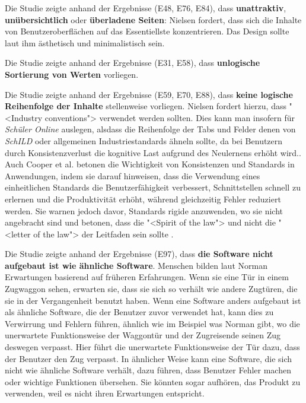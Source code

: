 Die Studie zeigte anhand der Ergebnisse (E48, E76, E84), dass \textbf{unattraktiv}, \textbf{unübersichtlich} oder \textbf{überladene Seiten}: Nielsen fordert, dass sich die Inhalte von Benutzeroberflächen auf das Essentiellste konzentrieren. Das Design sollte laut ihm ästhetisch und minimalistisch sein. \cite{Nielsen10}

Die Studie zeigte anhand der Ergebnisse (E31, E58), dass \textbf{unlogische Sortierung von Werten} vorliegen.

Die Studie zeigte anhand der Ergebnisse (E59, E70, E88), dass \textbf{keine logische Reihenfolge der Inhalte} stellenweise vorliegen. Nielsen fordert hierzu, dass "<Industry conventions"> verwendet werden sollten.\cite{Nielsen10} Dies kann man insofern für \textit{Schüler Online} auslegen, alsdass die Reihenfolge der Tabs und Felder denen von \textit{SchILD} oder allgemeinen Industriestandards ähneln sollte, da bei Benutzern durch Konsistenzverlust die kognitive Last aufgrund des Neulernens erhöht wird.\cite{Nielsen10}. Auch Cooper et al. betonen die Wichtigkeit von Konsistenzen und Standards in Anwendungen, indem sie darauf hinweisen, dass die Verwendung eines einheitlichen Standards die Benutzerfähigkeit verbessert, Schnittstellen schnell zu erlernen und die Produktivität erhöht, während gleichzeitig Fehler reduziert werden. Sie warnen jedoch davor, Standards rigide anzuwenden, wo sie nicht angebracht sind und betonen, dass die "<Spirit of the law"> und nicht die "<letter of the law"> der Leitfaden sein sollte \cite{CooperReimannEtAl14}.

Die Studie zeigte anhand der Ergebnisse (E97), dass \textbf{die Software nicht aufgebaut ist wie ähnliche Software}. Menschen bilden laut Norman Erwartungen basierend auf früheren Erfahrungen. Wenn sie eine Tür in einem Zugwaggon sehen, erwarten sie, dass sie sich so verhält wie andere Zugtüren, die sie in der Vergangenheit benutzt haben. Wenn eine Software anders aufgebaut ist als ähnliche Software, die der Benutzer zuvor verwendet hat, kann dies zu Verwirrung und Fehlern führen, ähnlich wie im Beispiel was Norman gibt, wo die unerwartete Funktionsweise der Waggontür und der Zugreisende seinen Zug deswegen verpasst. Hier führt die unerwartete Funktionsweise der Tür dazu, dass der Benutzer den Zug verpasst.\cite{Norman} In ähnlicher Weise kann eine Software, die sich nicht wie ähnliche Software verhält, dazu führen, dass Benutzer Fehler machen oder wichtige Funktionen übersehen. Sie könnten sogar aufhören, das Produkt zu verwenden, weil es nicht ihren Erwartungen entspricht.  

